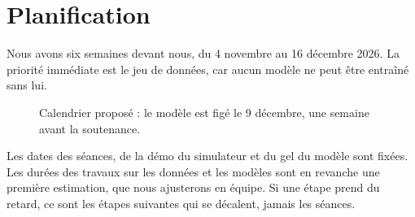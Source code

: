 \section{Planification}
\label{sec:planification}

Nous avons six semaines devant nous, du 4 novembre au 16 décembre 2026. La priorité immédiate est le jeu de données, car aucun modèle ne peut être entraîné sans lui.

\begin{figure}[H]
  \centering
  
  \caption{Calendrier proposé : le modèle est figé le 9 décembre, une semaine avant la soutenance.}
  \label{fig:planning}
\end{figure}

Les dates des séances, de la démo du simulateur et du gel du modèle sont fixées. Les durées des travaux sur les données et les modèles sont en revanche une première estimation, que nous ajusterons en équipe. Si une étape prend du retard, ce sont les étapes suivantes qui se décalent, jamais les séances.
